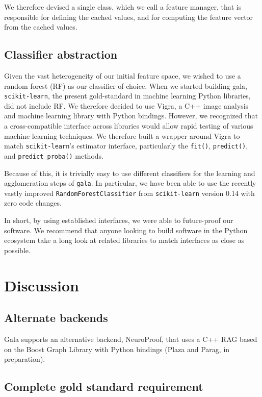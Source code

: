 \documentclass{frontiersSCNS} %
\begin{document}
We therefore devised a single class, which we call a feature manager, that is responsible for defining the cached values, and for computing the feature vector from the cached values.


\subsection{Classifier abstraction}

Given the vast heterogeneity of our initial feature space, we wished to use a random forest (RF) as our classifier of choice.
When we started building gala, \texttt{scikit-learn}, the present gold-standard in machine learning Python libraries, did not include RF.
We therefore decided to use Vigra, a C++ image analysis and machine learning library with Python bindings.
However, we recognized that a cross-compatible interface across libraries would allow rapid testing of various machine learning techniques.
We therefore built a wrapper around Vigra to match \texttt{scikit-learn}'s estimator interface, particularly the \texttt{fit()}, \texttt{predict()}, and \texttt{predict\_proba()} methods.

Because of this, it is trivially easy to use different classifiers for the learning and agglomeration steps of \texttt{gala}.
In particular, we have been able to use the recently vastly improved \texttt{RandomForestClassifier} from \texttt{scikit-learn} version 0.14 with zero code changes.

In short, by using established interfaces, we were able to future-proof our software.
We recommend that anyone looking to build software in the Python ecosystem take a long look at related libraries to match interfaces as close as possible.


\section{Discussion}


\subsection{Alternate backends}

Gala supports an alternative backend, NeuroProof, that uses a C++ RAG based on the Boost Graph Library with Python bindings (Plaza and Parag, in preparation).

\subsection{Complete gold standard requirement}
\end{document}
